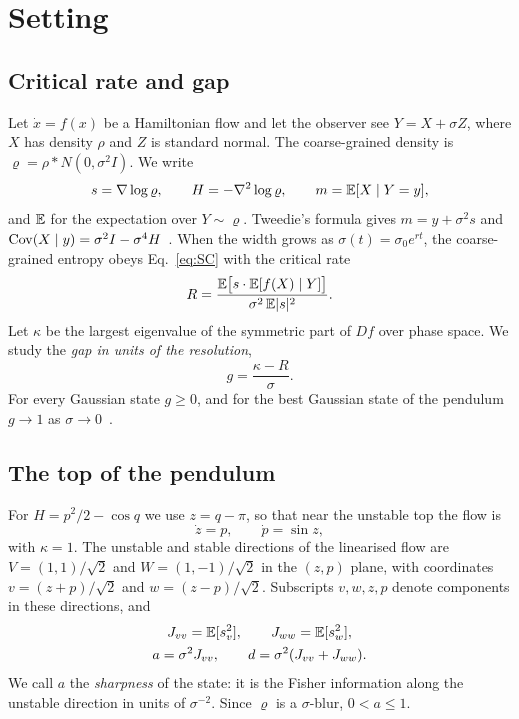 \section{Setting}
\label{sec:setting}

\subsection{Critical rate and gap}

Let $\dot x = f(x)$ be a Hamiltonian flow and let the observer see $Y = X + \sigma Z$, where $X$ has density $\rho$ and $Z$ is standard normal. The coarse-grained density is $\varrho = \rho * N(0, \sigma^2 I)$. We write
\begin{equation}
s = \nabla\log\varrho, \qquad H = -\nabla^2\log\varrho, \qquad m = \mathbb{E}[X \mid Y = y],
\end{equation}
and $\mathbb{E}$ for the expectation over $Y \sim \varrho$. Tweedie's formula gives $m = y + \sigma^2 s$ and $\operatorname{Cov}(X \mid y) = \sigma^2 I - \sigma^4 H$~\cite{efron2011}. When the width grows as $\sigma(t) = \sigma_0 e^{rt}$, the coarse-grained entropy obeys Eq.~\eqref{eq:SC} with the critical rate~\cite{namba2026arrow,namba2026learned}
\begin{equation}
R = \frac{\mathbb{E}\big[s \cdot \mathbb{E}[f(X) \mid Y]\big]}{\sigma^2\,\mathbb{E}|s|^2}.
\label{eq:R}
\end{equation}
Let $\kappa$ be the largest eigenvalue of the symmetric part of $Df$ over phase space. We study the \emph{gap in units of the resolution},
\begin{equation}
g = \frac{\kappa - R}{\sigma}.
\end{equation}
For every Gaussian state $g \geq 0$, and for the best Gaussian state of the pendulum $g \to 1$ as $\sigma \to 0$~\cite{namba2026gap}.

\subsection{The top of the pendulum}

For $H = p^2/2 - \cos q$ we use $z = q - \pi$, so that near the unstable top the flow is
\begin{equation}
\dot z = p, \qquad \dot p = \sin z,
\end{equation}
with $\kappa = 1$. The unstable and stable directions of the linearised flow are $V = (1,1)/\sqrt2$ and $W = (1,-1)/\sqrt2$ in the $(z,p)$ plane, with coordinates $v = (z + p)/\sqrt2$ and $w = (z - p)/\sqrt2$. Subscripts $v, w, z, p$ denote components in these directions, and
\begin{gather}
J_{vv} = \mathbb{E}[s_v^2], \qquad J_{ww} = \mathbb{E}[s_w^2], \nonumber\\
a = \sigma^2 J_{vv}, \qquad d = \sigma^2(J_{vv} + J_{ww}).
\end{gather}
We call $a$ the \emph{sharpness} of the state: it is the Fisher information along the unstable direction in units of $\sigma^{-2}$. Since $\varrho$ is a $\sigma$-blur, $0 < a \leq 1$.

